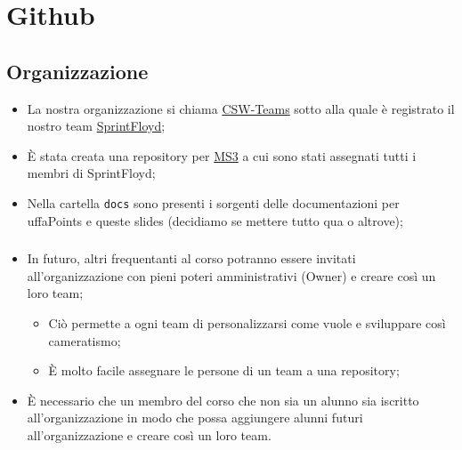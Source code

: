 \documentclass[compress]{beamer}
\begin{document}
    
\begin{frame}[plain]
    \titlepage
\end{frame}

\section{Github}
\subsection{Organizzazione}
\begin{frame}{\subsecname}
    \begin{itemize}
        \item La nostra organizzazione si chiama \href{https://github.com/CSW-Teams}{CSW-Teams}
        sotto alla quale è registrato il nostro team \href{https://github.com/orgs/CSW-Teams/teams/sprintfloyd}{SprintFloyd};
        \item È stata creata una repository per \href{https://github.com/CSW-Teams/MS3}{MS3}
        a cui sono stati assegnati tutti i membri di SprintFloyd;
        \item Nella cartella \texttt{docs} sono presenti i sorgenti delle documentazioni per uffaPoints e queste slides
        (decidiamo se mettere tutto qua o altrove);
    \end{itemize}
\end{frame}
\begin{frame}
    \frametitle{\subsecname}
    \begin{itemize}
        \item In futuro, altri frequentanti al corso potranno essere invitati
        all'organizzazione con pieni poteri amministrativi (Owner) e creare così un loro
        team;
        \begin{itemize}
            \item[\checkmark] Ciò permette a ogni team di personalizzarsi come vuole e sviluppare così cameratismo;
            \item[\checkmark] È molto facile assegnare le persone di un team a una repository;   
        \end{itemize}
        \item È necessario che un membro del corso che non sia un alunno sia iscritto all'organizzazione in modo
        che possa aggiungere alunni futuri all'organizzazione e creare così un loro team.
    \end{itemize}
\end{frame}
\end{document}
